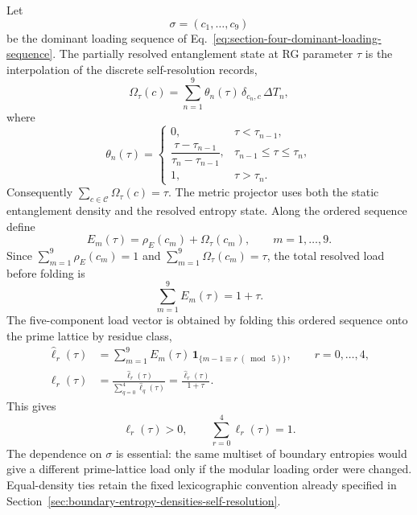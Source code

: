 \documentclass[11pt,letterpaper]{article}
\theoremstyle{plain}
\begin{document}
Let
\begin{equation}
\label{eq:section-five-dominant-sequence-reminder}
 \sigma=(c_1,\ldots,c_9)
\end{equation}
be the dominant loading sequence of
Eq.~\eqref{eq:section-four-dominant-loading-sequence}.  The partially resolved
entanglement state at RG parameter $\tau$ is the interpolation of the discrete
self-resolution records,
\begin{equation}
\label{eq:section-five-interpolated-entropy-state}
 \Omega_{\tau}(c)
 =
 \sum_{n=1}^{9}
 \theta_n(\tau)\,
 \delta_{c_n,c}\,
 \Delta T_n,
\end{equation}
where
\begin{equation}
\label{eq:section-five-resolution-window}
 \theta_n(\tau)
 =
 \begin{cases}
 0,& \tau<\tau_{n-1},\\
 \dfrac{\tau-\tau_{n-1}}{\tau_n-\tau_{n-1}},&
 \tau_{n-1}\le\tau\le\tau_n,\\
 1,& \tau>\tau_n.
 \end{cases}
\end{equation}
Consequently $\sum_{c\in\mathcal C}\Omega_{\tau}(c)=\tau$.  The metric
projector uses both the static entanglement density and the resolved entropy
state.  Along the ordered sequence define
\begin{equation}
\label{eq:section-five-sequence-entanglement-mass}
 E_m(\tau)
 =
 \rho_E(c_m)+\Omega_{\tau}(c_m),
 \qquad
 m=1,\ldots,9.
\end{equation}
Since $\sum_{m=1}^9\rho_E(c_m)=1$ and
$\sum_{m=1}^9\Omega_{\tau}(c_m)=\tau$, the total resolved load before folding
is
\begin{equation}
\label{eq:section-five-total-sequence-load}
 \sum_{m=1}^{9}E_m(\tau)=1+\tau.
\end{equation}
The five-component load vector is obtained by folding this ordered sequence
onto the prime lattice by residue class,
\begin{align}
\label{eq:section-five-load-vector-construction}
 \widehat\ell_r(\tau)
 &=
 \sum_{m=1}^{9}
 E_m(\tau)\,
 \mathbf 1_{\{m-1\equiv r\;(\bmod\;5)\}},
 \qquad r=0,\ldots,4,\nonumber\\
 \ell_r(\tau)
 &=
 \frac{\widehat\ell_r(\tau)}
 {\sum_{q=0}^{4}\widehat\ell_q(\tau)}
 =
 \frac{\widehat\ell_r(\tau)}{1+\tau}.
\end{align}
This gives
\begin{equation}
\label{eq:section-five-load-vector-normalization}
 \ell_r(\tau)>0,
 \qquad
 \sum_{r=0}^{4}\ell_r(\tau)=1.
\end{equation}
The dependence on $\sigma$ is essential: the same multiset of boundary
entropies would give a different prime-lattice load only if the modular loading
order were changed.  Equal-density ties retain the fixed lexicographic convention
already specified in Section~\ref{sec:boundary-entropy-densities-self-resolution}.
\end{document}
